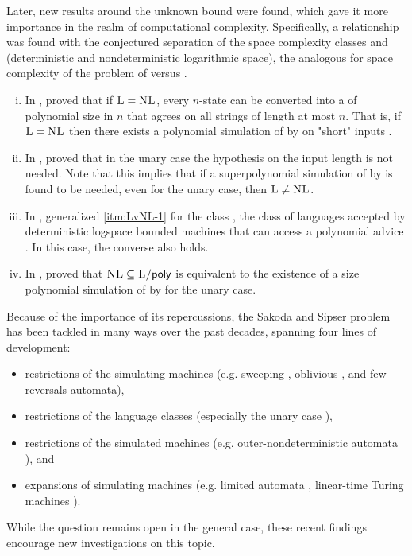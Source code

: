 Later, new results around the unknown bound were found, which gave it more importance in the realm of computational complexity.
Specifically, a relationship was found with the conjectured separation of the space complexity classes \cL and \cNL (deterministic and nondeterministic logarithmic space), the analogous for space complexity of the problem of \cP versus \cNP.
\begin{enumerate}[(i)]
	\item\label{itm:LvNL-1} In \citeyear{BerLin77}, \citeauthor{BerLin77} proved that if $\textsc{L}=\textsc{NL}$, every $n$-state \TNFA can be converted into a \TDFA of polynomial size in $n$ that agrees on all strings of length at most $n$.
	      That is, if $\textsc{L}=\textsc{NL}$ then there exists a polynomial simulation of \TNFAs by \TDFAs on "short" inputs \cite{BerLin77}.
	\item In \citeyear{GefPig11}, \citeauthor{GefPig11} proved that in the unary case the hypothesis on the input length is not needed.
	      Note that this implies that if a superpolynomial simulation of \TNFAs by \TDFAs is found to be needed, even for the unary case, then $\textsc{L}\ne\textsc{NL}$.
	\item In \citeyear{Kap14}, \citeauthor{Kap14} generalized \ref{itm:LvNL-1} for the class \cPolyL, the class of languages accepted by deterministic logspace bounded machines that can access a polynomial advice \cite{Kap14,KarLip82}. In this case, the converse also holds.
	\item In \citeyear{KapPig12}, \citeauthor{KapPig12} proved that $\textsc{NL}\subseteq\textsc{L/\ensuremath{\mathsf{poly}}}$ is equivalent to the existence of a size polynomial simulation of \TNFAs by \TDFAs for the unary case.
\end{enumerate}

Because of the importance of its repercussions, the Sakoda and Sipser problem has been tackled in many ways over the past decades, spanning four lines of development:
\begin{itemize}
	\item restrictions of the simulating machines (e.g. sweeping \cite{Sip80}, oblivious \cite{HroSch03}, and few reversals \cite{Kap13} automata),
	\item restrictions of the language classes (especially the unary case \cite{GefMer+07}),
	\item restrictions of the simulated machines (e.g. outer-nondeterministic automata \cite{GefGui+14,KapPig12}), and
	\item expansions of simulating machines (e.g. limited automata \cite{PigPis14,PigPri19,GuiPri19,PigPri+22}, linear-time Turing machines \cite{Pru14,GuiPig+18,Hen65,GuiPig+23}).
\end{itemize}
While the question remains open in the general case, these recent findings encourage new investigations on this topic.

